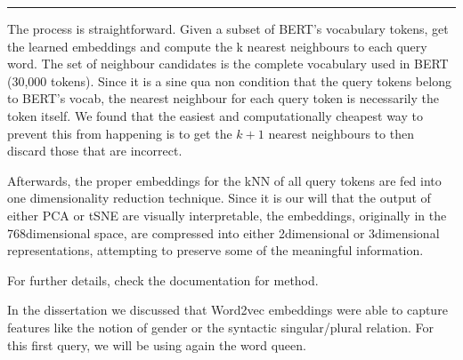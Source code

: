 \documentclass[letterpaper,10pt,english]{sphinxmanual}
\begin{document}
\bigskip\hrule\bigskip


The process is straightforward. Given a subset of BERT’s vocabulary tokens, get the learned embeddings and compute the k nearest neighbours to each query word. The set of neighbour candidates is the complete vocabulary used in BERT (30,000 tokens). Since it is a sine qua non condition that the query tokens belong to BERT’s vocab, the nearest neighbour for each query token is necessarily the token itself. We found that the easiest and computationally cheapest way to prevent this from happening is
to get the \(k+1\) nearest neighbours to then discard those that are incorrect.

Afterwards, the proper embeddings for the kNN of all query tokens are fed into one dimensionality reduction technique. Since it is our will that the output of either PCA or t\sphinxhyphen{}SNE are visually interpretable, the embeddings, originally in the 768\sphinxhyphen{}dimensional space, are compressed into either 2\sphinxhyphen{}dimensional or 3\sphinxhyphen{}dimensional representations, attempting to preserve some of the meaningful information.

For further details, check the documentation for  method.

In the dissertation we discussed that Word2vec embeddings were able to capture features like the notion of gender or the syntactic singular/plural relation. For this first query, we will be using again the word queen.
\end{document}
